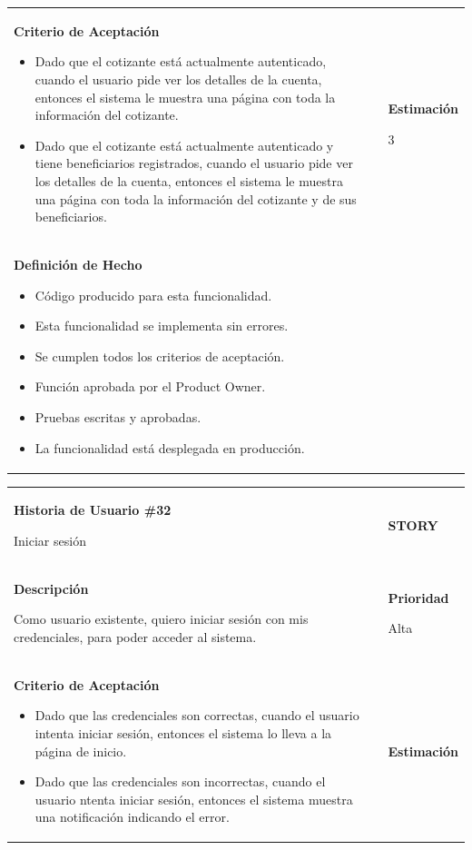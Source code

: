 \documentclass[12pt,a4paper]{article}
\begin{document}
\begin{center}
\begin{tabular}{| p{10cm} c p{2.5cm}|}
\textbf{Criterio de Aceptación}

\begin{itemize}
\item Dado que el cotizante está actualmente autenticado, cuando el
usuario pide ver los detalles de la cuenta, entonces el sistema le
muestra una página con toda la información del cotizante.
\item Dado que el cotizante está actualmente autenticado y tiene
beneficiarios registrados, cuando el usuario pide ver los detalles
de la cuenta, entonces el sistema le muestra una página con toda
la información del cotizante y de sus beneficiarios.
\end{itemize} & & \textbf{Estimación}

3 \\ 

\textbf{Definición de Hecho}

\begin{itemize}
\item Código producido para esta funcionalidad.
\item Esta funcionalidad se implementa sin errores.
\item Se cumplen todos los criterios de aceptación.
\item Función aprobada por el Product Owner.
\item Pruebas escritas y aprobadas.
\item La funcionalidad está desplegada en producción.
\end{itemize} & & \\
\hline 
\end{tabular}
\vspace{5mm}

\begin{tabular}{| p{10cm} c p{2.5cm}|}
\hline 
\textbf{Historia de Usuario \#32}

Iniciar sesión & & \textbf{{\Large STORY}} \\ 
\textbf{Descripción}

Como usuario existente, quiero iniciar sesión con mis credenciales, para
poder acceder al sistema. &  & \textbf{Prioridad}

Alta\\

\textbf{Criterio de Aceptación}

\begin{itemize}
\item Dado que las credenciales son correctas, cuando el usuario
intenta iniciar sesión, entonces el sistema lo lleva a la página de
inicio.
\item Dado que las credenciales son incorrectas, cuando el usuario
ntenta iniciar sesión, entonces el sistema muestra una
notificación indicando el error.
\end{itemize} & & \textbf{Estimación}


\end{tabular}
\end{center}
\end{document}
